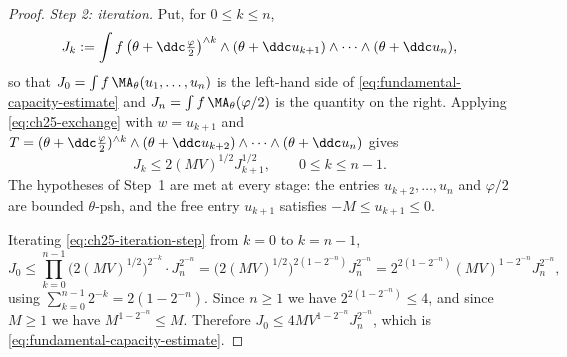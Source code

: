 \begin{proof}
\emph{Step 2: iteration.}  Put, for $0\leq k\leq n$,
\[
 J_k:=\int f\,
  \bigl(\theta+\ddc\tfrac\varphi2\bigr)^{\wedge k}
  \wedge(\theta+\ddc u_{k+1})\wedge\cdots\wedge(\theta+\ddc u_n),
\]
so that $J_0=\int f\,\MA_\theta(u_1,\ldots,u_n)$ is the left-hand side of
\eqref{eq:fundamental-capacity-estimate} and
$J_n=\int f\,\MA_\theta(\varphi/2)$ is the quantity on the right.  Applying
\eqref{eq:ch25-exchange} with $w=u_{k+1}$ and
$T=(\theta+\ddc\frac\varphi2)^{\wedge k}\wedge(\theta+\ddc u_{k+2})
\wedge\cdots\wedge(\theta+\ddc u_n)$ gives
\begin{equation}
\label{eq:ch25-iteration-step}
 J_k\leq2(MV)^{1/2}J_{k+1}^{1/2},\qquad 0\leq k\leq n-1 .
\end{equation}
The hypotheses of Step~1 are met at every stage: the entries
$u_{k+2},\ldots,u_n$ and $\varphi/2$ are bounded $\theta$-psh, and the
free entry $u_{k+1}$ satisfies $-M\leq u_{k+1}\leq0$.

Iterating \eqref{eq:ch25-iteration-step} from $k=0$ to $k=n-1$,
\[
 J_0\leq\prod_{k=0}^{n-1}\bigl(2(MV)^{1/2}\bigr)^{2^{-k}}\cdot
 J_n^{2^{-n}}
 =\bigl(2(MV)^{1/2}\bigr)^{2(1-2^{-n})}J_n^{2^{-n}}
 =2^{2(1-2^{-n})}(MV)^{1-2^{-n}}J_n^{2^{-n}},
\]
using $\sum_{k=0}^{n-1}2^{-k}=2(1-2^{-n})$.  Since $n\geq1$ we have
$2^{2(1-2^{-n})}\leq4$, and since $M\geq1$ we have
$M^{1-2^{-n}}\leq M$.  Therefore
$J_0\leq4MV^{1-2^{-n}}J_n^{2^{-n}}$, which is
\eqref{eq:fundamental-capacity-estimate}.
\end{proof}

